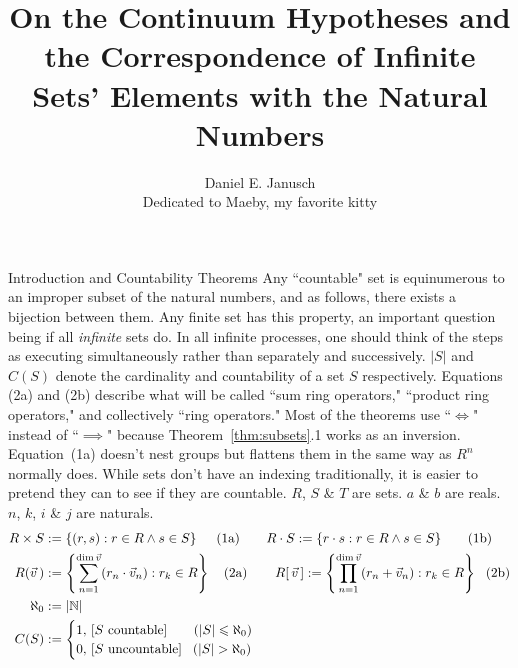 \documentclass[12pt]{article}
\begin{document}
\title{On the Continuum Hypotheses and the Correspondence of Infinite Sets' Elements with the
	Natural Numbers}
\author{Daniel E. Janusch\\Dedicated to Maeby, my favorite kitty}
\maketitle

\begin{section}{Introduction and Countability Theorems}\label{sec:intro}
	Any ``countable" set is equinumerous to an improper subset of the natural numbers, and as
	follows, there exists a bijection between them. Any finite set has this property, an important
	question being if all \emph{infinite} sets do. In all infinite processes, one should
	think of the steps as executing simultaneously rather than separately and successively.
	$|S|$ and $C(S)$ denote the cardinality and countability of a set $S$ respectively.
	Equations (2a) and (2b) describe what will be called ``sum ring operators,"
	``product ring operators," and collectively ``ring operators." Most of the theorems use
	``$\iff$" instead of ``$\implies$" because Theorem~\ref{thm:subsets}.1 works as an
	inversion. Equation~(1a) doesn't nest groups but flattens them in the same way as $R^n$
	normally does. While sets don't have an indexing traditionally, it is easier to pretend
	they can to see if they are countable. $R$, $S$ \& $T$ are sets. $a$ \& $b$ are reals.
	$n$, $k$, $i$ \& $j$ are naturals.\vspace{-1em}\\
	\begin{align}
		R\times S & :=\left\{(r,s):r\in R\land s\in S\right\}~~~~(1\text a)
		\hspace{2em}
		R\cdot S:=\left\{r\cdot s:r\in R\land s\in S\right\}~~~~~\,(1\text b)\\
		R(\vec v\,) & :=\left\{\sum_{n=1}^{\text{dim}\,\vec v}(r_n\cdot\vec
		v_n):r_k\in R\right\}~~~(2\text a)
		\hspace{2.1em}
		R[\,\vec v\,]:=\left\{\prod_{n=1}^{\text{dim}\,\vec v}(r_n+\vec v_n):r_k\in
		R\right\}~~(2\text b)\\
		\aleph_0 & := |\mathbb N|\\
		C(S) & :=\begin{cases}
			1,\,\left[S\text{ countable}\right]\phantom{un}~~(|S|\leqslant\aleph_0)\\
			0,\,\left[S\text{ uncountable}\right]~~(|S|>\aleph_0)\\
		\end{cases}
	\end{align}


\end{section}
\end{document}
